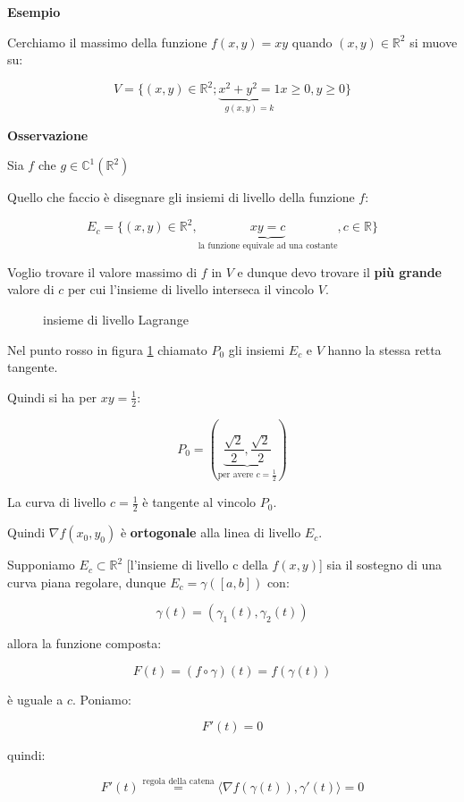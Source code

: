 \documentclass[../appunti-analisi.tex]{subfiles}
\begin{document}
\textbf{Esempio} 

Cerchiamo il massimo della funzione $f(x,y) = xy$ quando $(x,y) \in \mathbb{R}^{2}$ si muove su:

\[
    V= \{(x,y) \in \mathbb{R}^{2};\underbrace{ x^{2}+y^{2}=1}_\text{$g(x,y) = k$} x \ge 0, y \ge 0\}
\]

\textbf{Osservazione} 

Sia $f$ che $g \in \mathbb{C}^{1}(\mathbb{R}^{2})$

Quello che faccio è disegnare gli insiemi di livello della funzione $f$:

\[
    E_c = \{(x,y) \in \mathbb{R}^{2}, \underbrace{xy = c}_\text{la funzione equivale ad una costante}, c \in \mathbb{R}\}
\]

Voglio trovare il valore massimo di $f$ in $V$ e dunque devo trovare il \textbf{più grande} valore di $c$ per cui l'insieme di livello interseca il vincolo $V$.


\begin{figure}[ht]
    \caption{insieme di livello Lagrange}
    \label{fig:insieme-di-livello-lagrange}
\end{figure}

Nel punto rosso in figura \ref{fig:insieme-di-livello-lagrange} chiamato $P_0$ gli insiemi $E_c$ e $V$ hanno la stessa retta tangente.

Quindi si ha per $xy = \frac{1}{2}$:

\[
P_0 = ( \underbrace{\frac{\sqrt{2}}{2}, \frac{\sqrt{2}}{2}}_\text{per avere $c= \frac{1}{2}$})
\]

La curva di livello $c=\frac{1}{2}$ è tangente al vincolo $P_0$.

Quindi $\nabla f(x_0,y_0)$ è \textbf{ortogonale} alla linea di livello $E_c$.

Supponiamo $E_c \subset \mathbb{R}^{2}$ [l'insieme di livello c della $f(x,y)$] sia il sostegno di una curva piana regolare, dunque $E_c = \gamma([a,b])$ con:

\[
    \gamma(t) = (\gamma_1(t), \gamma_2(t))
\]

allora la funzione composta:

\[
    F(t) = (f \circ \gamma) (t) = f(\gamma(t))
\]

è uguale a $c$. Poniamo:

\[
    F'(t)=0
\]

quindi:

\[
    F'(t) \overset{\text{regola della catena}}{=} \langle \nabla f(\gamma(t)), \gamma'(t) \rangle = 0
\]
\end{document}
